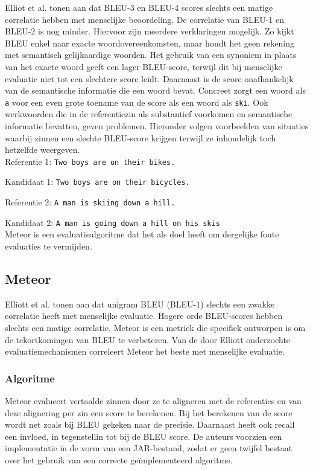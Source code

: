 Elliot et al.\cite{Elliott2014} tonen aan dat BLEU-3 en BLEU-4 scores slechts een matige correlatie hebben met menselijke beoordeling. De correlatie van BLEU-1 en BLEU-2 is nog minder.
Hiervoor zijn meerdere verklaringen mogelijk. Zo kijkt BLEU enkel naar exacte woordovereenkomsten, maar houdt het geen rekening met semantisch gelijkaardige woorden. Het gebruik van een synoniem in plaats van het exacte woord geeft een lager BLEU-score, terwijl dit bij menselijke evaluatie niet tot een slechtere score leidt. Daarnaast is de score onafhankelijk van de semantische informatie die een woord bevat. Concreet zorgt een woord als \texttt{a} voor een even grote toename van de score als een woord als \texttt{ski}. Ook werkwoorden die in de referentiezin als substantief voorkomen en semantische informatie bevatten, geven problemen. Hieronder volgen voorbeelden van situaties waarbij zinnen een slechte BLEU-score krijgen terwijl ze inhoudelijk toch hetzelfde weergeven.
\\

Referentie 1: \texttt{Two boys are on their bikes.}

Kandidaat 1: \texttt{Two boys are on their bicycles.}

Referentie 2: \texttt{A man is skiing down a hill.}

Kandidaat 2: \texttt{A man is going down a hill on his skis}
\\

Meteor is een evaluatiealgoritme dat het als doel heeft om dergelijke foute evaluaties te vermijden.

\subsection{Meteor}
Elliott et al.\cite{Elliott2014} tonen aan dat unigram BLEU (BLEU-1) slechts een zwakke correlatie heeft met menselijke evaluatie. Hogere orde BLEU-scores hebben slechts een matige correlatie. Meteor is een metriek die specifiek ontworpen is om de tekortkomingen van BLEU te verbeteren. Van de door Elliott onderzochte evaluatiemechanismen correleert Meteor het beste met menselijke evaluatie.

\subsubsection{Algoritme}
Meteor\cite{Denkowski2007a} evalueert vertaalde zinnen door ze te aligneren met de referenties en van deze alignering per zin een score te berekenen. Bij het berekenen van de score wordt net zoals bij BLEU gekeken naar de precisie. Daarnaast heeft ook recall een invloed, in tegenstellin tot bij de BLEU score. De auteurs voorzien een implementatie in de vorm van een JAR-bestand, zodat er geen twijfel bestaat over het gebruik van een correcte ge\"implementeerd algoritme.

